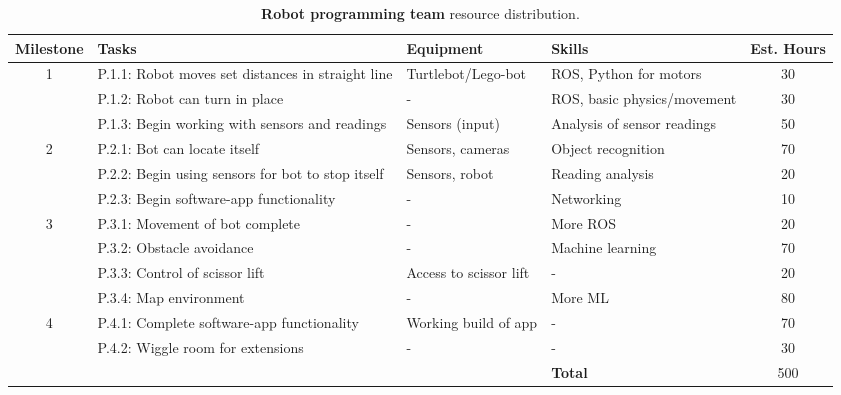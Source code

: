 \documentclass{article}
\begin{document}
\begin{table*}[]
  \begin{center}
  \begin{small}
  \begin{tabular}{|c|l|l|l|c|}
    \hline
    {\bf Milestone} & {\bf Tasks} & {\bf Equipment} & {\bf Skills} & {\bf Est. Hours} \\ \hline
    1               & P.1.1: Robot moves set distances in straight line & Turtlebot/Lego-bot & ROS, Python for motors & 30\\ \cline{2-5}
                    & P.1.2: Robot can turn in place & - & ROS, basic physics/movement & 30\\ \cline{2-5}
                    & P.1.3: Begin working with sensors and readings & Sensors (input) & Analysis of sensor readings & 50 \\ \hline
    2               & P.2.1: Bot can locate itself & Sensors, cameras & Object recognition & 70\\ \cline{2-5}
                    & P.2.2: Begin using sensors for bot to stop itself & Sensors, robot & Reading analysis & 20\\ \cline{2-5}
                    & P.2.3: Begin software-app functionality & - & Networking & 10\\ \hline
    3               & P.3.1: Movement of bot complete & - & More ROS & 20\\ \cline{2-5}
                    & P.3.2: Obstacle avoidance & - & Machine learning & 70\\ \cline{2-5}
                    & P.3.3: Control of scissor lift & Access to scissor lift & - & 20\\ \cline{2-5}
                    & P.3.4: Map environment & - & More ML & 80\\ \hline
    4               & P.4.1: Complete software-app functionality & Working build of app & - & 70\\ \cline{2-5}
                    & P.4.2: Wiggle room for extensions & - & - & 30\\ \hline
                    &  &  & {\bf Total} & 500 \\ \hline
  \end{tabular}
  \end{small}
  \caption{{\bf Robot programming team} resource distribution.}
  \label{tab:rp-rd}
  \end{center}
\end{table*}
\end{document}
